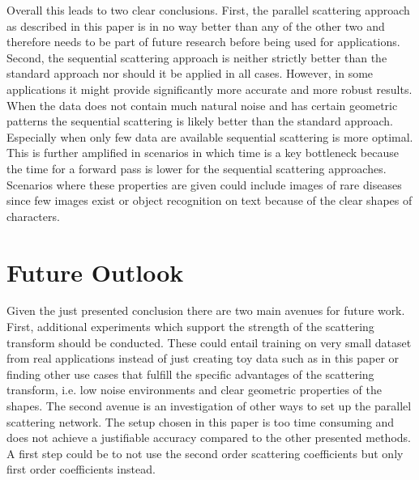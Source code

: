 Overall this leads to two clear conclusions. First, the parallel scattering approach as described in this paper is in no way better than any of the other two and therefore needs to be part of future research before being used for applications. Second, the sequential scattering approach is neither strictly better than the standard approach nor should it be applied in all cases. However, in some applications it might provide significantly more accurate and more robust results. When the data does not contain much natural noise and has certain geometric patterns the sequential scattering is likely better than the standard approach. Especially when only few data are available sequential scattering is more optimal. This is further amplified in scenarios in which time is a key bottleneck because the time for a forward pass is lower for the sequential scattering approaches. Scenarios where these properties are given could include images of rare diseases since few images exist or object recognition on text because of the clear shapes of characters. 

\section{Future Outlook}

Given the just presented conclusion there are two main avenues for future work. First, additional experiments which support the strength of the scattering transform should be conducted. These could entail training on very small dataset from real applications instead of just creating toy data such as in this paper or finding other use cases that fulfill the specific advantages of the scattering transform, i.e. low noise environments and clear geometric properties of the shapes. The second avenue is an investigation of other ways to set up the parallel scattering network. The setup chosen in this paper is too time consuming and does not achieve a justifiable accuracy compared to the other presented methods. A first step could be to not use the second order scattering coefficients but only first order coefficients instead. 